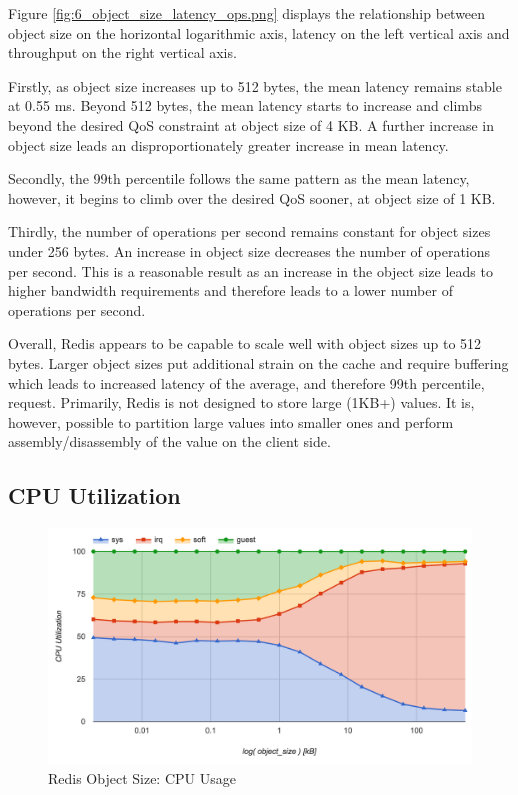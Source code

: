 Figure \ref{fig:6_object_size_latency_ops.png} displays the relationship between object size on the horizontal logarithmic axis, latency on the left vertical axis and throughput on the right vertical axis.

Firstly, as object size increases up to 512 bytes, the mean latency remains stable at 0.55 ms. Beyond 512 bytes, the mean latency starts to increase and climbs beyond the desired QoS constraint at object size of 4 KB. A further increase in object size leads an disproportionately greater increase in mean latency.

Secondly, the 99th percentile follows the same pattern as the mean latency, however, it begins to climb over the desired QoS sooner, at object size of 1 KB.

Thirdly, the number of operations per second remains constant for object sizes under 256 bytes. An increase in object size decreases the number of operations per second. This is a reasonable result as an increase in the object size leads to higher bandwidth requirements and therefore leads to a lower number of operations per second.

Overall, Redis appears to be capable to scale well with object sizes up to 512 bytes. Larger object sizes put additional strain on the cache and require buffering which leads to increased latency of the average, and therefore 99th percentile, request. Primarily, Redis is not designed to store large (1KB+) values. It is, however, possible to partition large values into smaller ones and perform assembly/disassembly of the value on the client side.

\subsection{CPU Utilization}
\begin{figure}[h]
    \includegraphics[width=\textwidth]{./res/6_object_size_cpu.png}
    \caption{Redis Object Size: CPU Usage}
    \label{fig:6_object_size_cpu.png}
\end{figure}


